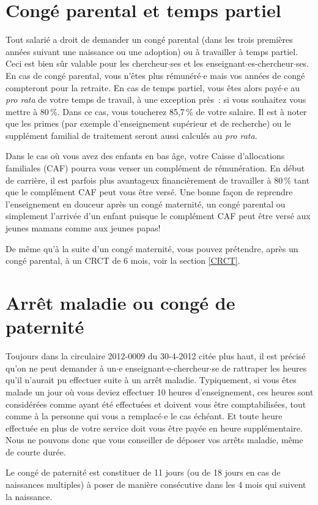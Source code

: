 \section{Cong\'e parental et temps partiel}

Tout salari\'e a droit de demander un cong\'e parental (dans les trois
premi\`eres ann\'ees suivant une naissance ou une adoption) ou \`a travailler \`a temps
partiel. Ceci est bien s\^ur valable pour les chercheur$\cdot$ses et les
enseignant$\cdot$es-chercheur$\cdot$ses. En cas de cong\'e parental, vous n'\^etes plus
r\'emun\'er\'e$\cdot$e mais vos ann\'ees de cong\'e compteront pour la
retraite. En cas de temps partiel, vous \^etes alors pay\'e$\cdot$e au {\em
pro rata} de votre temps de travail, \`a une exception pr\`es~: si
vous souhaitez vous mettre \`a 80\,\%. Dans ce cas, vous toucherez
85,7\,\% de votre salaire. Il est \`a noter que les primes (par exemple
d'enseignement sup\'erieur et de recherche) ou le suppl\'ement
familial de traitement seront aussi calcul\'es au {\em pro rata}.

Dans le cas o\`u vous avez des enfants en bas \^age, votre Caisse
d'allocations familiales (CAF) pourra vous verser un compl\'ement de r\'emun\'eration. En d\'ebut
de carri\`ere, il est parfois plus avantageux financi\`erement de travailler \`a
80\,\% tant que le compl\'ement CAF peut vous \^etre vers\'e. Une bonne fa\c con
de reprendre l'enseignement en douceur apr\`es un cong\'e maternit\'e, un cong\'e
parental ou simplement l'arriv\'ee d'un enfant puisque le compl\'ement CAF peut \^etre
vers\'e aux jeunes mamans comme aux jeunes papas!

De m\^eme qu'\`a la suite d'un cong\'e maternit\'e, vous pouvez pr\'etendre,
apr\`es un cong\'e parental, \`a un CRCT de 6 mois, voir la section \ref{CRCT}.

\section{Arr\^et maladie ou cong\'e de paternit\'e}

Toujours dans la circulaire 2012-0009 du 30-4-2012 cit\'ee plus haut, il est pr\'ecis\'e qu'on ne peut demander \`a un$\cdot$e
enseignant$\cdot$e-chercheur$\cdot$se de rattraper les heures qu'il n'aurait pu
effectuer suite \`a un arr\^et maladie. Typiquement, si vous \^etes
malade un jour o\`u vous deviez effectuer 10 heures d'enseignement,
ces heures sont consid\'er\'ees comme ayant \'et\'e effectu\'ees et
doivent vous \^etre comptabilis\'ees, tout comme \`a la personne qui
vous a remplac\'e$\cdot$e le cas \'ech\'eant. Et toute heure effectu\'ee en
plus de votre service doit vous \^etre pay\'ee en heure
suppl\'ementaire. Nous ne pouvons donc que vous conseiller de
d\'eposer vos arr\^ets maladie, m\^eme de courte dur\'ee.

Le cong\'e de paternit\'e est constituer de 11 jours (ou de 18 jours en cas de naissances multiples) 
\`a poser de mani\`ere cons\'ecutive dans les 4 mois qui suivent la naissance. 


